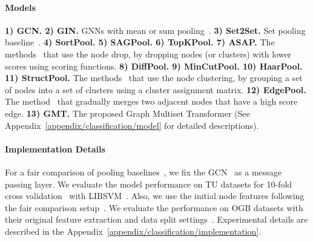 \documentclass{article} \usepackage{iclr2021_conference,times}
\begin{document}
\paragraph{Models}
\textbf{1) GCN. 2) GIN.} GNNs with mean or sum pooling~\citep{GCN, GIN}. \textbf{3) Set2Set.} Set pooling baseline~\citep{Set2Set}. \textbf{4) SortPool. 5) SAGPool. 6) TopKPool. 7) ASAP.} The methods~\citep{SortPool, SAGPool, TopKPool, ASAP} that use the node drop, by dropping nodes (or clusters) with lower scores using scoring functions. \textbf{8) DiffPool. 9) MinCutPool. 10) HaarPool. 11) StructPool.} The methods~\citep{DiffPool, MincutPool, HaarPool, StructPool} that use the node clustering, by grouping a set of nodes into a set of clusters using a cluster assignment matrix. \textbf{12) EdgePool.} The method~\citep{edgepool} that gradually merges two adjacent nodes that have a high score edge. \textbf{13) GMT.} The proposed Graph Multiset Transformer (See Appendix~\ref{appendix/classification/model} for detailed descriptions).

\vspace{-0.03in}
\paragraph{Implementation Details}
For a fair comparison of pooling baselines~\citep{SAGPool}, we fix the GCN~\citep{GCN} as a message passing layer. We evaluate the model performance on TU datasets for 10-fold cross validation~\citep{SortPool, GIN} with LIBSVM~\citep{LIBSVM}. Also, we use the initial node features following the fair comparison setup~\citep{fair/GNN}. We evaluate the performance on OGB datasets with their original feature extraction and data split settings~\citep{OGB}. Experimental details are described in the Appendix~\ref{appendix/classification/implementation}.
\end{document}
